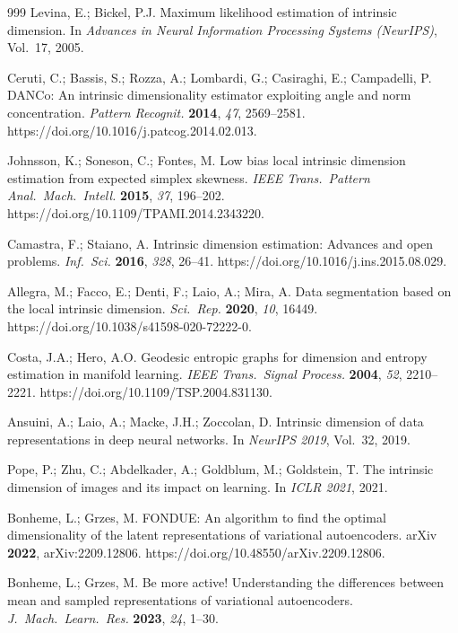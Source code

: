 \documentclass[11pt,a4paper]{jsarticle}
\begin{document}
\begin{thebibliography}{999}
Levina, E.; Bickel, P.J.
Maximum likelihood estimation of intrinsic dimension.
In \textit{Advances in Neural Information Processing Systems (NeurIPS)},
Vol.~17, 2005.

Ceruti, C.; Bassis, S.; Rozza, A.; Lombardi, G.; Casiraghi, E.;
Campadelli, P.
DANCo: An intrinsic dimensionality estimator exploiting angle and norm
concentration.
\textit{Pattern Recognit.} \textbf{2014}, \textit{47}, 2569--2581.
https://doi.org/10.1016/j.patcog.2014.02.013.

Johnsson, K.; Soneson, C.; Fontes, M.
Low bias local intrinsic dimension estimation from expected simplex
skewness.
\textit{IEEE Trans.\ Pattern Anal.\ Mach.\ Intell.} \textbf{2015},
\textit{37}, 196--202. https://doi.org/10.1109/TPAMI.2014.2343220.

Camastra, F.; Staiano, A.
Intrinsic dimension estimation: Advances and open problems.
\textit{Inf.\ Sci.} \textbf{2016}, \textit{328}, 26--41.
https://doi.org/10.1016/j.ins.2015.08.029.

Allegra, M.; Facco, E.; Denti, F.; Laio, A.; Mira, A.
Data segmentation based on the local intrinsic dimension.
\textit{Sci.\ Rep.} \textbf{2020}, \textit{10}, 16449.
https://doi.org/10.1038/s41598-020-72222-0.

Costa, J.A.; Hero, A.O.
Geodesic entropic graphs for dimension and entropy estimation in manifold
learning.
\textit{IEEE Trans.\ Signal Process.} \textbf{2004}, \textit{52},
2210--2221. https://doi.org/10.1109/TSP.2004.831130.

Ansuini, A.; Laio, A.; Macke, J.H.; Zoccolan, D.
Intrinsic dimension of data representations in deep neural networks.
In \textit{NeurIPS 2019}, Vol.~32, 2019.

Pope, P.; Zhu, C.; Abdelkader, A.; Goldblum, M.; Goldstein, T.
The intrinsic dimension of images and its impact on learning.
In \textit{ICLR 2021}, 2021.

Bonheme, L.; Grzes, M.
FONDUE: An algorithm to find the optimal dimensionality of the latent
representations of variational autoencoders.
arXiv \textbf{2022}, arXiv:2209.12806.
https://doi.org/10.48550/arXiv.2209.12806.

Bonheme, L.; Grzes, M.
Be more active! Understanding the differences between mean and sampled
representations of variational autoencoders.
\textit{J.\ Mach.\ Learn.\ Res.} \textbf{2023}, \textit{24}, 1--30.


\end{thebibliography}
\end{document}
